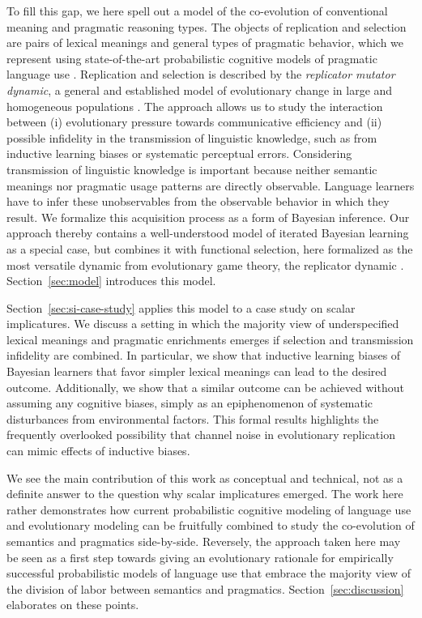 \documentclass[a4paper]{article}
\begin{document}
To fill this gap, we here spell out a model of the co-evolution of conventional meaning and
pragmatic reasoning types. The objects of replication and selection are pairs of lexical
meanings and general types of pragmatic behavior, which we represent using state-of-the-art
probabilistic cognitive models of pragmatic language use
\citep{frank+goodman:2012,FrankeJager2015:Probabilistic-p,GoodmanFrank2016:Pragmatic-Langu}. Replication
and selection is described by the \emph{replicator mutator dynamic}, a general and established
model of evolutionary change in large and homogeneous populations
\citep{Hofbauer1985:The-Selection-M,nowak+etal:2000,NowakKomarova2001:Evolution-of-Un,hofbauer+sigmund:2003,Nowak2006:Evolutionary-Dy}. The
approach allows us to study the interaction between (i) evolutionary pressure towards
communicative efficiency and (ii) possible infidelity in the transmission of linguistic
knowledge, such as from inductive learning biases or systematic perceptual errors. Considering
transmission of linguistic knowledge is important because neither semantic meanings nor
pragmatic usage patterns are directly observable. Language learners have to infer these
unobservables from the observable behavior in which they result. We formalize this acquisition
process as a form of Bayesian inference. Our approach thereby contains a well-understood model
of iterated Bayesian learning \citep{griffiths+kalish:2007} as a special case, but combines it
with functional selection, here formalized as the most versatile dynamic from evolutionary game
theory, the replicator dynamic
\citep{TaylorJonker1978:Evolutionary-St}. Section~\ref{sec:model} introduces this model.

Section~\ref{sec:si-case-study} applies this model to a case study on scalar implicatures. We
discuss a setting in which the majority view of underspecified lexical meanings and pragmatic
enrichments emerges if selection and transmission infidelity are combined. In particular, we
show that inductive learning biases of Bayesian learners that favor simpler lexical meanings
can lead to the desired outcome. Additionally, we show that a similar outcome can be achieved
without assuming any cognitive biases, simply as an epiphenomenon of systematic disturbances from
environmental factors. This formal results highlights the frequently overlooked possibility
that channel noise in evolutionary replication can mimic effects of inductive biases.

We see the main contribution of this work as conceptual and technical, not as a definite answer
to the question why scalar implicatures emerged. The work here rather demonstrates how current
probabilistic cognitive modeling of language use and evolutionary modeling can be fruitfully
combined to study the co-evolution of semantics and pragmatics side-by-side. Reversely, the
approach taken here may be seen as a first step towards giving an evolutionary rationale for
empirically successful probabilistic models of language use that embrace the majority view of
the division of labor between semantics and pragmatics. Section~\ref{sec:discussion} elaborates
on these points.
\end{document}
